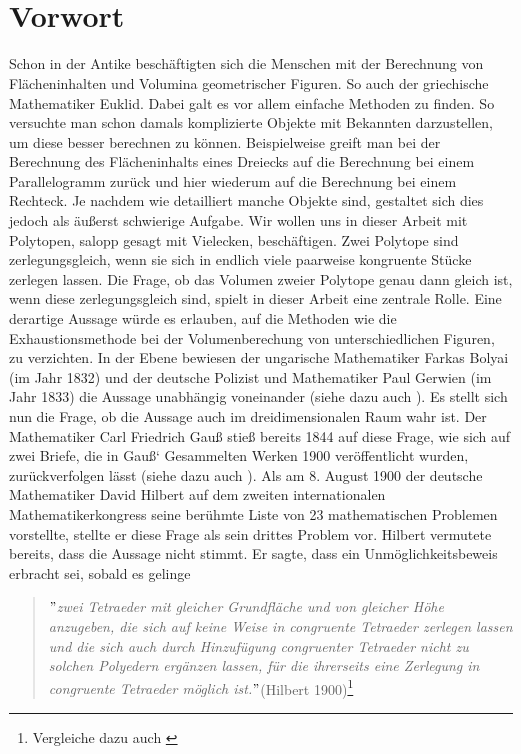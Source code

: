\documentclass[11pt,titlepage]{article}
\theoremstyle{definition}
\theoremstyle{remark}
\begin{document}
	\newpage \ 
	\thispagestyle{empty}
	\newpage
	\thispagestyle{empty}
	
	\tableofcontents
	
	
	\newpage \
	\thispagestyle{empty} 
	\newpage
	\setcounter{page}{1}
	
	\section*{Vorwort}
	
	Schon in der Antike beschäftigten sich die Menschen mit der Berechnung 
	von Flächeninhalten und Volumina geometrischer Figuren. So auch 
	der griechische Mathematiker Euklid. Dabei galt es vor allem 
	einfache Methoden zu finden. So versuchte man schon damals komplizierte 
	Objekte mit Bekannten darzustellen, um diese besser berechnen zu können. 
	Beispielweise greift man bei der Berechnung des Flächeninhalts eines 
	Dreiecks auf die Berechnung bei einem Parallelogramm zurück und hier 
	wiederum auf die Berechnung bei einem Rechteck. Je nachdem wie 
	detailliert manche Objekte sind, gestaltet sich dies jedoch als äußerst 
	schwierige Aufgabe. Wir wollen uns in dieser Arbeit mit Polytopen, 
	salopp gesagt mit Vielecken, beschäftigen. Zwei Polytope sind 
	zerlegungsgleich, wenn sie sich in endlich viele paarweise kongruente 
	Stücke zerlegen lassen. Die Frage, ob das Volumen zweier Polytope genau 
	dann gleich ist, wenn diese zerlegungsgleich sind, spielt in dieser 
	Arbeit eine zentrale Rolle. Eine derartige Aussage würde es erlauben, 
	auf die Methoden wie die Exhaustionsmethode bei der Volumenberechung von 
	unterschiedlichen Figuren, zu verzichten. In der Ebene 
	bewiesen der ungarische Mathematiker Farkas Bolyai (im Jahr 1832) und 
	der deutsche Polizist und Mathematiker Paul Gerwien (im Jahr 1833) 
	die Aussage unabhängig voneinander (siehe dazu auch \cite{Boltianskii}). 
	Es stellt sich nun die Frage, ob die Aussage auch im dreidimensionalen 
	Raum wahr ist. Der Mathematiker Carl Friedrich Gauß stieß bereits 1844 
	auf diese Frage, wie sich auf zwei Briefe, die in Gauß` Gesammelten Werken 
	1900 veröffentlicht wurden, zurückverfolgen lässt (siehe dazu 
	auch \cite{Proofsfromthebook}). Als am 8. August 1900 der deutsche 
	Mathematiker David Hilbert auf dem zweiten internationalen Mathematikerkongress 
	seine berühmte Liste von 23 mathematischen Problemen vorstellte, stellte 
	er diese Frage als sein drittes Problem vor. Hilbert vermutete bereits, 
	dass die Aussage nicht stimmt. Er sagte, dass ein Unmöglichkeitsbeweis 
	erbracht sei, sobald es gelinge
	\begin{quote}
		\textsl{$"$zwei Tetraeder mit gleicher Grundfläche
			und von gleicher Höhe anzugeben, die sich auf keine Weise in
			congruente Tetraeder zerlegen lassen und die sich auch durch 
			Hinzufügung congruenter Tetraeder nicht zu solchen Polyedern ergänzen
			lassen, für die ihrerseits eine Zerlegung in congruente Tetraeder
			möglich ist.$"$}(Hilbert 1900)\footnote{Vergleiche dazu auch \cite{Hilbert1900}}
	\end{quote}
\end{document}
